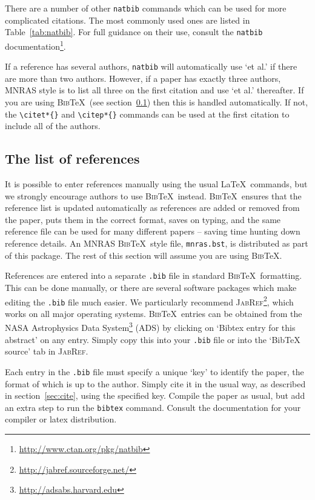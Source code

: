 \documentclass[fleqn,usenatbib,useAMS]{mnras}
\newcommand{\bibtex}{\textsc{Bib}\!\TeX} %
\begin{document}
There are a number of other \verb'natbib' commands which can be used for more complicated citations.
The most commonly used ones are listed in Table~\ref{tab:natbib}.
For full guidance on their use, consult the \verb'natbib' documentation\footnote{\url{http://www.ctan.org/pkg/natbib}}.

If a reference has several authors, \verb'natbib' will automatically use `et al.' if there are more than two authors. However, if a paper has exactly three authors, MNRAS style is to list all three on the first citation and use `et al.' thereafter. If you are using \bibtex\ (see section~\ref{sec:ref_list}) then this is handled automatically. If not, the \verb'\citet*{}' and \verb'\citep*{}' commands can be used at the first citation to include all of the authors.

\subsection{The list of references}
\label{sec:ref_list}

It is possible to enter references manually using the usual \LaTeX\ commands, but we strongly encourage authors to use \bibtex\ instead.
\bibtex\ ensures that the reference list is updated automatically as references are added or removed from the paper, puts them in the correct format, saves on typing, and the same reference file can be used for many different papers -- saving time hunting down reference details.
An MNRAS \bibtex\ style file, \verb'mnras.bst', is distributed as part of this package.
The rest of this section will assume you are using \bibtex.

References are entered into a separate \verb'.bib' file in standard \bibtex\ formatting.
This can be done manually, or there are several software packages which make editing the \verb'.bib' file much easier.
We particularly recommend \textsc{JabRef}\footnote{\url{http://jabref.sourceforge.net/}}, which works on all major operating systems.
\bibtex\ entries can be obtained from the NASA Astrophysics Data System\footnote{\label{foot:ads}\url{http://adsabs.harvard.edu}} (ADS) by clicking on `Bibtex entry for this abstract' on any entry.
Simply copy this into your \verb'.bib' file or into the `BibTeX source' tab in \textsc{JabRef}.

Each entry in the \verb'.bib' file must specify a unique `key' to identify the paper, the format of which is up to the author.
Simply cite it in the usual way, as described in section~\ref{sec:cite}, using the specified key.
Compile the paper as usual, but add an extra step to run the \texttt{bibtex} command.
Consult the documentation for your compiler or latex distribution.
\end{document}
